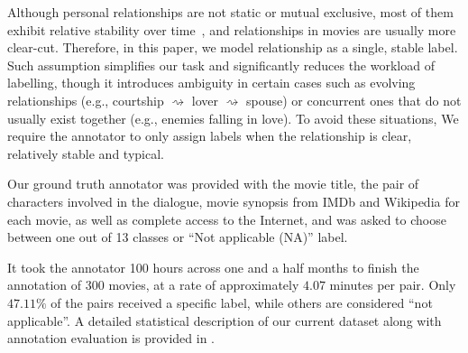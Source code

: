 Although personal relationships are not static or mutual exclusive, 
most of them exhibit relative stability over time~\cite{stability}, and
 relationships in movies are usually more clear-cut. 
Therefore, in this paper, we model relationship as a single, 
stable label. Such assumption simplifies our task and 
significantly reduces the workload of labelling, though it introduces 
ambiguity in certain cases such as evolving relationships 
(e.g., courtship $\rightsquigarrow$ lover $\rightsquigarrow$ spouse) or 
concurrent ones that do not usually exist together
(e.g., enemies falling in love). To avoid these situations, 
We require the annotator to only 
assign labels when the relationship is clear, relatively stable and typical.

Our ground truth annotator was provided with the movie title, 
the pair of characters involved in the dialogue, 
movie synopsis from IMDb and Wikipedia for each movie, 
as well as complete access to the Internet, 
and was asked to choose between one out of 13 classes or 
``Not applicable (NA)'' label. 

It took the annotator 100 hours across one and a half months to 
finish the annotation of 300 movies, at a rate of approximately 
$4.07$ minutes per pair. Only $47.11\%$ of the pairs
received a specific label, while others are considered ``not applicable''. 
A detailed statistical description of our current dataset 
along with annotation evaluation is provided in .
